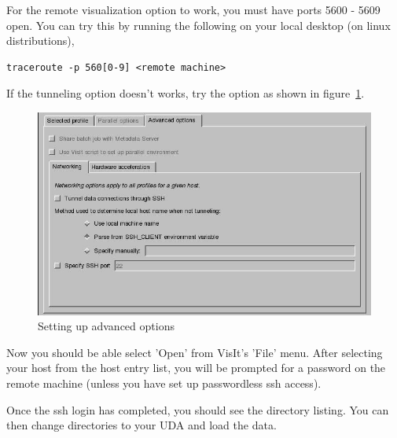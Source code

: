\documentclass[12pt]{article}
\begin{document}
For the remote visualization option to work, you must have ports 5600
- 5609 open. You can try this by running the following on your local
desktop (on linux distributions),

\begin{verbatim}
traceroute -p 560[0-9] <remote machine> 
\end{verbatim}

If the tunneling option doesn't works, try the option as shown in
figure~\ref{VisItHostProfileAdv2}.

\begin{figure}
  \center
  \includegraphics[scale=0.5]{VisItHostProfileAdv2.png}
  \caption{Setting up advanced options}
  \label{VisItHostProfileAdv2}
\end{figure}

Now you should be able select 'Open' from VisIt's 'File' menu. After
selecting your host from the host entry list, you will be prompted for
a password on the remote machine (unless you have set up passwordless
ssh access).

Once the ssh login has completed, you should see the directory
listing. You can then change directories to your UDA and load the
data.






\end{document}
